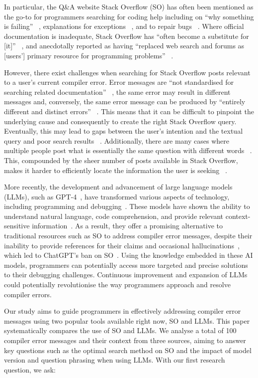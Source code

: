 \documentclass[preprint,12pt]{elsarticle}
\begin{document}
In particular, the Q\&A website Stack Overflow (SO) has often been mentioned as the go-to for programmers searching for coding help including on “why something is failing” ~\cite{r3}, explanations for exceptions ~\cite{r2}, and to repair bugs ~\cite{r7}. Where official documentation is inadequate, Stack Overflow has “often become a substitute for [it]” ~\cite{r8}, and anecdotally reported as having “replaced web search and forums as [users’] primary resource for programming problems” ~\cite{r9}.

However, there exist challenges when searching for Stack Overflow posts relevant to a user’s current compiler error. Error messages are “not standardised for searching related documentation” ~\cite{r1}, the same error may result in different messages and, conversely, the same error message can be produced by “entirely different and distinct errors” ~\cite{r11}. This means that it can be difficult to pinpoint the underlying cause and consequently to create the right Stack Overflow query. Eventually, this may lead to gaps between the user’s intention and the textual query and poor search results ~\cite{r3}. Additionally, there are many cases where multiple people post what is essentially the same question with different words ~\cite{r12}. This, compounded by the sheer number of posts available in Stack Overflow, makes it harder to efficiently locate the information the user is seeking ~\cite{r7, r13}.

More recently, the development and advancement of large language models (LLMs), such as GPT-4~\cite{openai2023gpt4}, have transformed various aspects of technology, including programming and debugging~\cite{sobania2023analysis}. These models have shown the ability to understand natural language, code comprehension, and provide relevant context-sensitive information~\cite{biswas2023role}. As a result, they offer a promising alternative to traditional resources such as SO to address compiler error messages, despite their inability to provide references for their claims and occasional hallucinations~\cite{c1}, which led to ChatGPT's ban on SO~\cite{c2}. Using the knowledge embedded in these AI models, programmers can potentially access more targeted and precise solutions to their debugging challenges. Continuous improvement and expansion of LLMs could potentially revolutionise the way programmers approach and resolve compiler errors.

Our study aims to guide programmers in effectively addressing compiler error messages using two popular tools available right now, SO and LLMs. This paper systematically compares the use of SO and LLMs. We analyse a total of 100 compiler error messages and their context from three sources, aiming to answer key questions such as the optimal search method on SO and the impact of model version and question phrasing when using LLMs. With our first research question, we ask:
\end{document}
